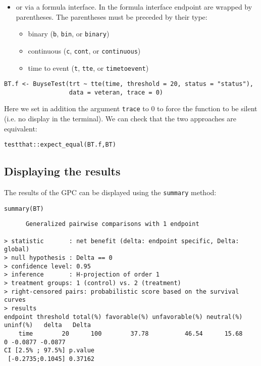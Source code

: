 \documentclass[12pt]{article}
\begin{document}
\clearpage

\begin{itemize}
\item or via a formula interface. In the formula interface endpoint are
wrapped by parentheses. The parentheses must be preceded by their
type: 
\begin{itemize}[label={-}]
\item binary (\texttt{b}, \texttt{bin}, or \texttt{binary})
\item continuous (\texttt{c}, \texttt{cont}, or  \texttt{continuous})
\item time to event (\texttt{t}, \texttt{tte}, or \texttt{timetoevent})
\end{itemize}
\end{itemize}

\lstset{language=r,label= ,caption= ,captionpos=b,numbers=none}
\begin{lstlisting}
BT.f <- BuyseTest(trt ~ tte(time, threshold = 20, status = "status"),
				  data = veteran, trace = 0)
\end{lstlisting}

Here we set in addition the argument \texttt{trace} to 0 to force the
function to be silent (i.e. no display in the terminal). We can check
that the two approaches are equivalent:
\lstset{language=r,label= ,caption= ,captionpos=b,numbers=none}
\begin{lstlisting}
testthat::expect_equal(BT.f,BT)
\end{lstlisting}

\subsection{Displaying the results}
\label{sec:org882cc03}

The results of the GPC can be displayed using the \texttt{summary} method:
\lstset{language=r,label= ,caption= ,captionpos=b,numbers=none}
\begin{lstlisting}
summary(BT)
\end{lstlisting}

\begin{verbatim}
      Generalized pairwise comparisons with 1 endpoint

> statistic       : net benefit (delta: endpoint specific, Delta: global) 
> null hypothesis : Delta == 0 
> confidence level: 0.95 
> inference       : H-projection of order 1
> treatment groups: 1 (control) vs. 2 (treatment) 
> right-censored pairs: probabilistic score based on the survival curves
> results
endpoint threshold total(%) favorable(%) unfavorable(%) neutral(%) uninf(%)   delta   Delta
    time        20      100        37.78          46.54      15.68        0 -0.0877 -0.0877
CI [2.5% ; 97.5%] p.value 
 [-0.2735;0.1045] 0.37162
\end{verbatim}
\end{document}
